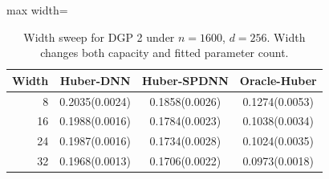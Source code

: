 \begin{table}[!ht]
\centering
\caption{Width sweep for DGP 2 under $n=1600$, $d=256$. Width changes both capacity and fitted parameter count.}
\label{tab:B-width}
\begin{adjustbox}{max width=\linewidth}
\begin{tabular}{@{}rccc@{}}
\toprule
Width & Huber-DNN & Huber-SPDNN & Oracle-Huber\\
\midrule
8 & 0.2035(0.0024) & 0.1858(0.0026) & 0.1274(0.0053)\\
16 & 0.1988(0.0016) & 0.1784(0.0023) & 0.1038(0.0034)\\
24 & 0.1987(0.0016) & 0.1734(0.0028) & 0.1024(0.0035)\\
32 & 0.1968(0.0013) & 0.1706(0.0022) & 0.0973(0.0018)\\
\bottomrule
\end{tabular}
\end{adjustbox}
\end{table}
